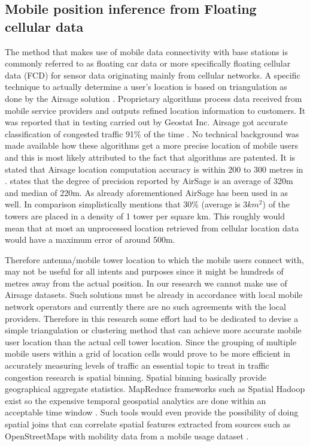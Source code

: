 \documentclass[12pt, a4paper]{report}
\theoremstyle{definition}
\theoremstyle{definition}%
\theoremstyle{definition}%
\theoremstyle{definition}%
\theoremstyle{definition}%
\theoremstyle{definition}%
\begin{document}
\subsection{Mobile position inference from Floating cellular data} \label{mobile_inference} 

The method that makes use of mobile data connectivity with base stations is commonly referred to as floating car data or more specifically floating cellular data (FCD) for sensor data originating mainly from cellular networks. A specific technique to actually determine a user's location is based on triangulation as done by the Airsage solution \cite{Hoteit2014}. Proprietary algorithms process data received from mobile service providers and outputs refined location information to customers. It was reported that in testing carried out by Geostat Inc. Airsage got accurate classification of congested traffic 91\% of the time  \cite{Wang2012}. No technical background was made available how these algorithms get a more precise location of mobile users and this is most likely attributed to the fact that algorithms are patented.  It is stated that Airsage location computation accuracy is within 200 to 300 metres in \cite{Colak2015}. \cite{Calabrese2013} states that the degree of precision reported by AirSage is an average of 320m and median of 220m. As already aforementioned AirSage has been used in \cite{Hoteit2014} as well. In comparison \cite{Gonzalez2008} simplistically mentions that 30\% (average is \(3km^{2}\)) of the towers are placed in a density of 1 tower per square km. This roughly would mean that at most an unprocessed location retrieved from cellular location data would have a maximum error of around 500m. 

Therefore antenna/mobile tower location to which the mobile users connect with, may not be useful for all intents and purposes since it might be hundreds of metres away from the actual position. In our research we cannot make use of Airsage datasets. Such solutions must be already in accordance with local mobile network operators and currently there are no such agreements with the local providers. Therefore in this research some effort had to be dedicated to devise a simple triangulation or clustering method that can achieve more accurate mobile user location than the actual cell tower location. Since the grouping of multiple mobile users within a grid of location cells would prove to be more efficient in accurately measuring levels of traffic an essential topic to treat in traffic congestion research is spatial binning. Spatial binning basically provide geographical aggregate statistics.  MapReduce frameworks such as Spatial Hadoop exist so the expensive temporal geospatial analytics are done within an acceptable time window \cite{Wu2014,eldawy2015spatialhadoop}. Such tools would even provide the possibility of doing spatial joins that can correlate spatial features extracted from sources such as OpenStreetMaps with mobility data from a mobile usage dataset \cite{Alarabi2014}.
\end{document}
